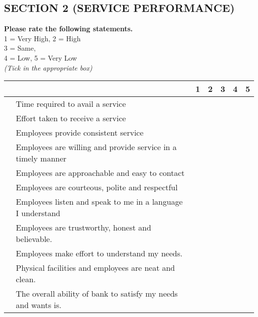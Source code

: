 \documentclass[12pt,a4paper]{extarticle}
\newcounter{magicrownumbers}
\newcommand\rownumber{\stepcounter{magicrownumbers}\arabic{magicrownumbers}}
\newcommand \tab[1][1cm]{\hspace*{#1}}
\begin{document}
{\begin{minipage}{\textwidth}
\end{minipage}

\newpage
\subsection*{SECTION 2 (SERVICE PERFORMANCE)}
\textbf{Please rate the following statements.}\\
1 = Very High, 2 = High\\
3 = Same,\\
4 = Low, 5 = Very Low\\
\emph {(Tick in the appropriate box)}\\
\begin{minipage}{\textwidth}

\begin{tabularx}{\linewidth}{|l|l|X|X|X|X|X|}
\hline \multicolumn{2}{|c|}{} & 1 & 2 & 3 & 4 & 5\\
\hline \rownumber & Time required to avail a service & \tab & \tab & \tab & \tab & \tab \\
\hline \rownumber & Effort taken to receive a service & \tab & \tab & \tab & \tab & \tab \\
\hline \rownumber & Employees provide consistent service & \tab & \tab & \tab & \tab & \tab \\
\hline \rownumber & Employees are willing and provide service in a timely manner & \tab & \tab & \tab & \tab & \tab \\
\hline \rownumber & Employees are approachable and easy to contact & \tab & \tab & \tab & \tab & \tab \\
\hline \rownumber & Employees are courteous, polite and respectful & \tab & \tab & \tab & \tab & \tab \\
\hline \rownumber & Employees listen and speak to me in  a language I understand & \tab & \tab & \tab & \tab & \tab \\
\hline \rownumber & Employees are trustworthy, honest and believable. & \tab & \tab & \tab & \tab & \tab \\
\hline \rownumber & Employees make effort to understand my needs.  & \tab & \tab & \tab & \tab & \tab \\
\hline \rownumber & Physical facilities and employees are neat and clean. & \tab & \tab & \tab & \tab & \tab \\
\hline \rownumber & The overall ability of bank to satisfy my needs and wants is. & \tab & \tab & \tab & \tab & \tab \\
\hline
\end{tabularx}

\end{minipage}}
\end{document}
